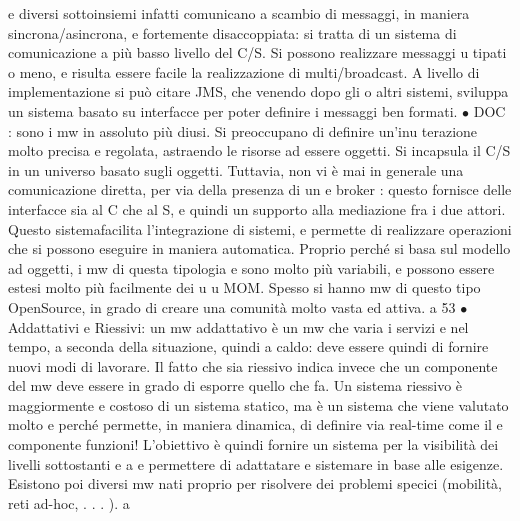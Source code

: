 e
diversi sottoinsiemi infatti comunicano a scambio di messaggi, in maniera
sincrona/asincrona, e fortemente disaccoppiata: si tratta di un sistema di
comunicazione a più basso livello del C/S. Si possono realizzare messaggi
u
tipati o meno, e risulta essere facile la realizzazione di multi/broadcast.
A livello di implementazione si può citare JMS, che venendo dopo gli
o
altri sistemi, sviluppa un sistema basato su interfacce per poter definire i
messaggi ben formati.
$\bullet$ DOC : sono i mw in assoluto più diusi. Si preoccupano di definire un'inu
terazione molto precisa e regolata, astraendo le risorse ad essere oggetti.
Si incapsula il C/S in un universo basato sugli oggetti. Tuttavia, non vi
è mai in generale una comunicazione diretta, per via della presenza di un
e
broker : questo fornisce delle interfacce sia al C che al S, e quindi un supporto alla mediazione fra i due attori.
Questo sistemafacilita l'integrazione
di sistemi, e permette di realizzare operazioni che si possono eseguire in
maniera automatica.
Proprio perché si basa sul modello ad oggetti, i mw di questa tipologia
e
sono molto più variabili, e possono essere estesi molto più facilmente dei
u
u
MOM. Spesso si hanno mw di questo tipo OpenSource, in grado di creare
una comunità molto vasta ed attiva.
a
53
$\bullet$ Addattativi e Riessivi: un mw addattativo è un mw che varia i servizi
e
nel tempo, a seconda della situazione, quindi a caldo: deve essere quindi
di fornire nuovi modi di lavorare.
Il fatto che sia riessivo indica invece che un componente del mw deve essere in grado di esporre quello che fa. Un
sistema riessivo è maggiormente
e
costoso di un sistema statico, ma è un sistema che viene valutato molto
e
perché permette, in maniera dinamica, di definire via real-time come il
e
componente funzioni!
L'obiettivo è quindi fornire un sistema per la visibilità dei livelli sottostanti
e
a
e permettere di adattatare e sistemare in base alle esigenze.
Esistono poi diversi mw nati proprio per risolvere dei problemi specici (mobilità, reti ad-hoc, . . . ).
a
